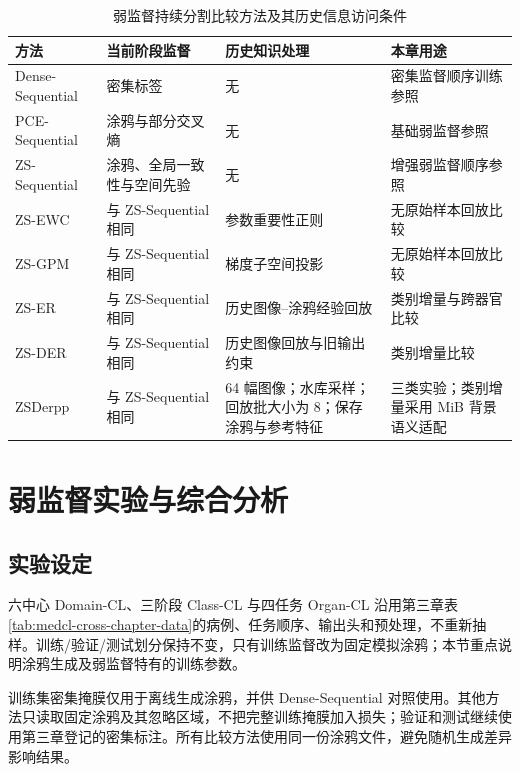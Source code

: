 \begin{table}[htbp]
\centering
\caption{弱监督持续分割比较方法及其历史信息访问条件}
\label{tab:scribblecl-methods}
\thesistablefont
\renewcommand{\arraystretch}{1.15}
\setlength{\tabcolsep}{3pt}
\begin{tabularx}{\textwidth}{@{}p{2.8cm}Xp{4.1cm}X@{}}
\toprule
方法 & 当前阶段监督 & 历史知识处理 & 本章用途 \\
\midrule
Dense-Sequential & 密集标签 & 无 & 密集监督顺序训练参照 \\
PCE-Sequential & 涂鸦与部分交叉熵 & 无 & 基础弱监督参照 \\
ZS-Sequential & 涂鸦、全局一致性与空间先验 & 无 & 增强弱监督顺序参照 \\
ZS-EWC & 与 ZS-Sequential 相同 & 参数重要性正则 & 无原始样本回放比较 \\
ZS-GPM & 与 ZS-Sequential 相同 & 梯度子空间投影 & 无原始样本回放比较 \\
ZS-ER & 与 ZS-Sequential 相同 & 历史图像--涂鸦经验回放 & 类别增量与跨器官比较 \\
ZS-DER & 与 ZS-Sequential 相同 & 历史图像回放与旧输出约束 & 类别增量比较 \\
ZSDerpp & 与 ZS-Sequential 相同 & 64 幅图像；水库采样；回放批大小为 8；保存涂鸦与参考特征 & 三类实验；类别增量采用 MiB 背景语义适配 \\
\bottomrule
\end{tabularx}
\end{table}


\section{弱监督实验与综合分析}
\label{sec:scribblecl-experiments}

\subsection{实验设定}
\label{subsec:scribblecl-experimental-settings}

\label{subsubsec:scribblecl-datasets}
六中心 Domain-CL、三阶段 Class-CL 与四任务 Organ-CL 沿用第三章表\ref{tab:medcl-cross-chapter-data}的病例、任务顺序、输出头和预处理，不重新抽样。训练/验证/测试划分保持不变，只有训练监督改为固定模拟涂鸦；本节重点说明涂鸦生成及弱监督特有的训练参数。

\label{subsubsec:scribblecl-reference-standard}
训练集密集掩膜仅用于离线生成涂鸦，并供 Dense-Sequential 对照使用。其他方法只读取固定涂鸦及其忽略区域，不把完整训练掩膜加入损失；验证和测试继续使用第三章登记的密集标注。所有比较方法使用同一份涂鸦文件，避免随机生成差异影响结果。

